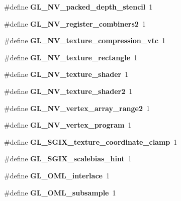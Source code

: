 \begin{DoxyCompactItemize}
\item 
\#define {\bfseries G\+L\+\_\+\+N\+V\+\_\+packed\+\_\+depth\+\_\+stencil}~1\label{_s_d_l__opengl_8h_aa1ffd16dc665b93e4478030924bffcf5}

\item 
\#define {\bfseries G\+L\+\_\+\+N\+V\+\_\+register\+\_\+combiners2}~1\label{_s_d_l__opengl_8h_a7eb76ac482451abcbb3b5611a5f1ac83}

\item 
\#define {\bfseries G\+L\+\_\+\+N\+V\+\_\+texture\+\_\+compression\+\_\+vtc}~1\label{_s_d_l__opengl_8h_a5ac0b387d19e6f0ac922a68124c35dc6}

\item 
\#define {\bfseries G\+L\+\_\+\+N\+V\+\_\+texture\+\_\+rectangle}~1\label{_s_d_l__opengl_8h_ace8ce07db854751cad87b31b3f55c409}

\item 
\#define {\bfseries G\+L\+\_\+\+N\+V\+\_\+texture\+\_\+shader}~1\label{_s_d_l__opengl_8h_ab86362fec338d4d0731d245ca84a1e9b}

\item 
\#define {\bfseries G\+L\+\_\+\+N\+V\+\_\+texture\+\_\+shader2}~1\label{_s_d_l__opengl_8h_a14ac2e5a1c68b3d0d2d49629eb043eb5}

\item 
\#define {\bfseries G\+L\+\_\+\+N\+V\+\_\+vertex\+\_\+array\+\_\+range2}~1\label{_s_d_l__opengl_8h_a16d29bf15764063bffbcc13b6c2229b8}

\item 
\#define {\bfseries G\+L\+\_\+\+N\+V\+\_\+vertex\+\_\+program}~1\label{_s_d_l__opengl_8h_a493ecff0ccdf5e8cdf033a02feedba94}

\item 
\#define {\bfseries G\+L\+\_\+\+S\+G\+I\+X\+\_\+texture\+\_\+coordinate\+\_\+clamp}~1\label{_s_d_l__opengl_8h_ac4f62e4bedb7e65f12be22e63026f504}

\item 
\#define {\bfseries G\+L\+\_\+\+S\+G\+I\+X\+\_\+scalebias\+\_\+hint}~1\label{_s_d_l__opengl_8h_ae1641098a74b286d2b43ab3a08edc3a3}

\item 
\#define {\bfseries G\+L\+\_\+\+O\+M\+L\+\_\+interlace}~1\label{_s_d_l__opengl_8h_ac76549439bf523904c16ea2b27e78726}

\item 
\#define {\bfseries G\+L\+\_\+\+O\+M\+L\+\_\+subsample}~1\label{_s_d_l__opengl_8h_adacd8cbfeb1a075149c02dfbc41522c7}


\end{DoxyCompactItemize}
